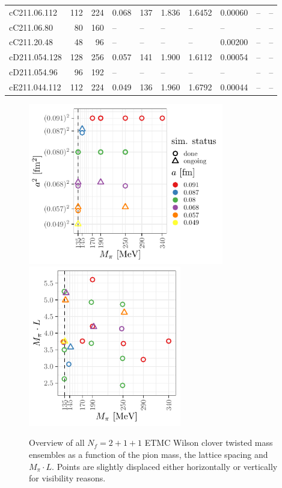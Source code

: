\documentclass[a4paper,11pt]{article}
\begin{document}
\begin{table}
\begin{tabular}{lrrlllllll}
    cC211.06.112  & 112   & 224   & 0.068         & 137   & 1.836   & 1.6452 & 0.00060    & --           & -- \\
    cC211.06.80   & 80    & 160   & --            & --    & --      & --     & --         & --           & -- \\
    cC211.20.48   & 48    & 96    & --            & --    & --      & --     & 0.00200    & --           & -- \\ \hline
    cD211.054.128 & 128   & 256   & 0.057         & 141   & 1.900   & 1.6112 & 0.00054    & --           & -- \\
    cD211.054.96  & 96    & 192   & --            & --    & --      & --     & --         & --           & -- \\ \hline
    cE211.044.112 & 112   & 224   & 0.049         & 136   & 1.960   & 1.6792 & 0.00044    & --           & -- \\ \hline
  \end{tabular}
\end{table}

\begin{figure}
  \includegraphics[height=7cm]{plots/ensembles_asquared_mpi}\hfill
  \includegraphics[height=7cm]{plots/ensembles_L_vs_mpi}
  \caption{Overview of all $N_f=2+1+1$ ETMC Wilson clover twisted mass ensembles as a function of the pion mass, the lattice spacing and $M_\pi \cdot L$. Points are slightly displaced either horizontally or vertically for visibility reasons.}
  \label{fig:ensemble_overview}
\end{figure}
\end{document}
